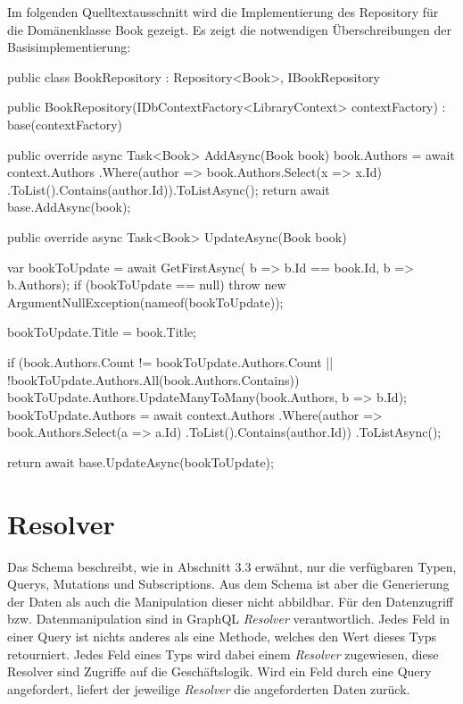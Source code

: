 Im folgenden Quelltextausschnitt wird die Implementierung des Repository für die Domänenklasse Book gezeigt.
Es zeigt die notwendigen Überschreibungen der Basisimplementierung:

\begin{JsCode}
public class BookRepository : Repository<Book>, IBookRepository {
    public BookRepository(IDbContextFactory<LibraryContext> contextFactory)
        : base(contextFactory) { }

    public override async Task<Book> AddAsync(Book book) {
        book.Authors = await context.Authors
            .Where(author => book.Authors.Select(x => x.Id)
            .ToList().Contains(author.Id)).ToListAsync();
        return await base.AddAsync(book);
    }

    public override async Task<Book> UpdateAsync(Book book) {
        var bookToUpdate = await GetFirstAsync(
            b => b.Id == book.Id, b => b.Authors);
        if (bookToUpdate == null) {
            throw new ArgumentNullException(nameof(bookToUpdate));
        }

        bookToUpdate.Title = book.Title;

        if (book.Authors.Count != bookToUpdate.Authors.Count
            || !bookToUpdate.Authors.All(book.Authors.Contains))
        {
            bookToUpdate.Authors.UpdateManyToMany(book.Authors, b => b.Id);
            bookToUpdate.Authors = await context.Authors
            .Where(author => book.Authors.Select(a => a.Id)
                            .ToList().Contains(author.Id))
                            .ToListAsync();
        }

        return await base.UpdateAsync(bookToUpdate);
    }
}
\end{JsCode}

\section{Resolver}
Das Schema beschreibt, wie in Abschnitt 3.3 erwähnt, nur die verfügbaren Typen, Querys, Mutations und Subscriptions.
Aus dem Schema ist aber die Generierung der Daten als auch die Manipulation dieser nicht abbildbar.
Für den Datenzugriff bzw. Datenmanipulation sind in GraphQL \textit{Resolver} verantwortlich.
Jedes Feld in einer Query ist nichts anderes als eine Methode, welches den Wert dieses Typs retourniert.
Jedes Feld eines Typs wird dabei einem \textit{Resolver} zugewiesen, diese Resolver sind Zugriffe auf die Geschäftslogik.
Wird ein Feld durch eine Query angefordert, liefert der jeweilige \textit{Resolver} die angeforderten Daten zurück.

